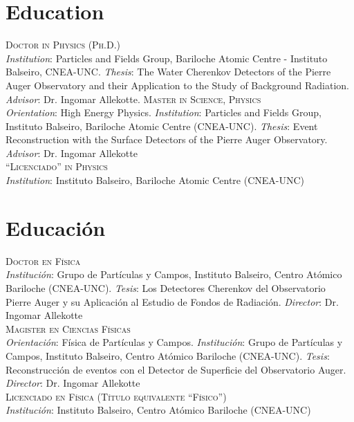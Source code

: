 \section*{Education}
\noindent
{}\textsc{Doctor in Physics (Ph.D.)}\\
{\emph{Institution}}: Particles and Fields Group, Bariloche Atomic Centre - Instituto Balseiro, CNEA-UNC. {\emph{Thesis}}: The Water Cherenkov Detectors of the Pierre Auger Observatory and their Application to the Study of Background Radiation. {\emph{Advisor}}: Dr. Ingomar Allekotte.
\textsc{Master in Science, Physics}\\
{\emph{Orientation}}: High Energy Physics. {\emph{Institution}}: Particles and Fields Group, Instituto Balseiro, Bariloche Atomic Centre (CNEA-UNC). {\emph{Thesis}}: Event Reconstruction with the Surface Detectors of the Pierre Auger Observatory. {\emph{Advisor}}: Dr. Ingomar Allekotte\\
\textsc{``Licenciado'' in Physics}\\
{\emph{Institution}}: Instituto Balseiro, Bariloche Atomic Centre (CNEA-UNC)\\
\else
\section*{Educación}
\noindent
{}\textsc{Doctor en Física}\\
{\emph{Institución}}: Grupo de Partículas y Campos, Instituto Balseiro, Centro Atómico Bariloche (CNEA-UNC). {\emph{Tesis}}: Los Detectores Cherenkov del Observatorio Pierre Auger y su Aplicación al Estudio de Fondos de Radiación. {\emph{Director}}: Dr. Ingomar Allekotte\\
\textsc{Magister en Ciencias Físicas}\\
{\emph{Orientación}}: Física de Partículas y Campos. {\emph{Institución}}: Grupo de Partículas y Campos, Instituto Balseiro, Centro Atómico Bariloche (CNEA-UNC). {\emph{Tesis}}: Reconstrucción de eventos con el Detector de Superficie del Observatorio Auger. {\emph{Director}}: Dr. Ingomar Allekotte\\
\textsc{Licenciado en Física (Título equivalente ``Físico'')}\\
{\emph{Institución}}: Instituto Balseiro, Centro Atómico Bariloche (CNEA-UNC)\\
\fi
